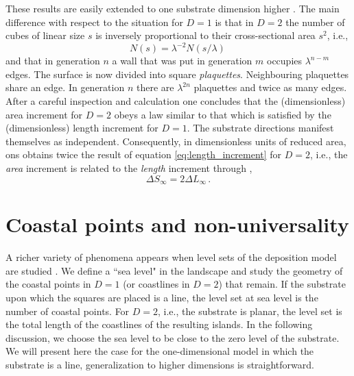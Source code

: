 \documentclass[amsmath,amssymb,amsfonts,aps,pre,preprint,superscriptaddress,bibnotes,showpacs,showkeys,longbibliography,nofootinbib]{revtex4-1}
\begin{document}
These results are easily extended to one substrate dimension higher \cite{INDEKEU1998294}. The main difference with respect to the situation for $D = 1$ is that in $D=2$ the number of cubes of linear size $s$ is inversely proportional to their cross-sectional area $s^2$, i.e.,
\begin{equation}
    \label{eq:square_distribution_cubes}
    N(s) = \lambda^{-2} N(s/\lambda)\, 
\end{equation}
and that in generation $n$ a wall that was put in generation $m$ occupies $\lambda^{n-m}$ edges. The surface is now divided into square \textsl{plaquettes}. Neighbouring plaquettes share an edge. In generation $n$ there are $\lambda^{2n}$ plaquettes and twice as many edges. After a careful inspection and calculation one concludes that the (dimensionless) area increment for $D=2$ obeys a law similar to that which is satisfied by the (dimensionless) length increment for $D=1$. The substrate directions manifest themselves as independent. Consequently, in dimensionless units of reduced  area, ons obtains twice the result of equation \eqref{eq:length_increment} for $D=2$, i.e., the \textsl{area} increment is related to the \textsl{length} increment through \cite{INDEKEU1998294},
\begin{equation}
    \label{eq:surface_area_increment}
    \Delta S_\infty = 2 \Delta L_\infty \, .
\end{equation}

\section{Coastal points and non-universality} \label{sec:coastal}
A richer variety of phenomena appears when level sets of the deposition model are studied \cite{INDEKEU2000135}. We define a ``sea level" in the landscape and study the geometry of the coastal points in $D=1$ (or coastlines in $D=2$) that remain. If the substrate upon which the squares are placed is a line, the level set at sea level is the number of coastal points. For $D=2$, i.e., the substrate is planar, the level set is the total length of the coastlines of the resulting islands. In the following discussion, we choose the sea level to be close to the zero level of the substrate. We will present here the case for the one-dimensional model in which the substrate is a line, generalization to higher dimensions is straightforward.
\end{document}
